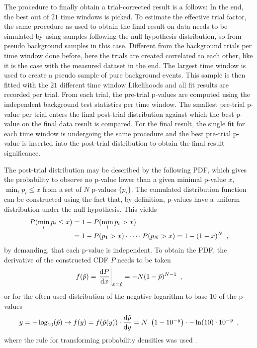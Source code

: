 The procedure to finally obtain a trial-corrected result is a follows:
In the end, the best out of $\num{21}$ time windows is picked.
To estimate the effective trial factor, the same procedure as used to obtain the final result on data needs to be simulated by using samples following the null hypothesis distribution, so from pseudo background samples in this case.
Different from the background trials per time window done before, here the trials are created correlated to each other, like it is the case with the measured dataset in the end.
The largest time window is used to create a pseudo sample of pure background events.
This sample is then fitted with the $\num{21}$ different time window Likelihoods and all fit results are recorded per trial.
From each trial, the pre-trial p-values are computed using the independent background test statistics per time window.
The smallest pre-trial p-value per trial enters the final post-trial distribution against which the best p-value on the final data result is compared.
For the final result, the single fit for each time window is undergoing the same procedure and the best pre-trial p-value is inserted into the post-trial distribution to obtain the final result significance.

The post-trial distribution may be described by the following PDF, which gives the probability to observe no p-value lower than a given minimal p-value $x$, $\min_i{p_i} \leq x$ from a set of $N$ p-values $\{p_i\}$.
The cumulated distribution function can be constructed using the fact that, by definition, p-values have a uniform distribution under the null hypothesis.
This yields
\begin{align}
  P(\min_i{p_i} \leq x)
  &= 1 - P(\min_i{p_i} > x) \\
  &= 1 - P(p_1 > x)\cdot\dots\cdot P(p_N > x)
  = 1 - (1-x)^N
  \enspace\text{,}
\end{align}
by demanding, that each p-value is independent.
To obtain the PDF, the derivative of the constructed CDF $P$ needs to be taken
\begin{equation}
  f(\hat{p})
  = \left. \frac{\mathrm{d}P}{\mathrm{d}x} \right|_{x=\hat{p}}
  = -N(1 - \hat{p})^{N-1}
  \enspace\text{,}
\end{equation}
or for the often used distribution of the negative logarithm to base $\num{10}$ of the p-values
\begin{equation}
  y = -\log_{10}(\hat{p})
  \rightarrow
  f(y) = f(\hat{p}(y))\cdot\dd{\hat{p}}{y}
  = N \left( 1 - 10^{-y} \right) \cdot -\ln(10)\cdot 10^{-y}
  \mcomma
\end{equation}
where the rule for transforming probability densities was used \cite{blobel2013statistische}.

